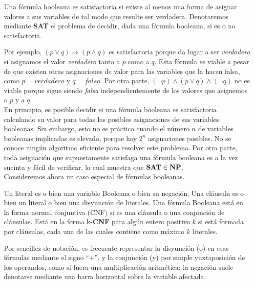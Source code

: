 \begin{fondo}
Una fórmula booleana es satisfactoria si existe al menos una forma de asignar valores a sus variables de tal modo que resulte ser verdadera. Denotaremos mediante \textbf{SAT} el problema de decidir, dada una fórmula booleana, si es o no satisfactoria.
\end{fondo}

Por ejemplo, $(p \lor q) \Longrightarrow (p \land q)$ es satisfactoria porque da lugar a ser \emph{verdadero} si asignamos el valor \emph{verdadero} tanto a $p$ como a $q$. Esta fórmula es viable a pesar de que existen otras asignaciones de valor para las variables que la hacen falsa, como $p = verdadero$ y $q = falso$. Por otra parte, $(\neg p) \land (p \lor q) \land (\neg q)$ no es viable porque sigue siendo \emph{falsa} independientemente de los valores que asignemos a $p$ y a $q$. \\

En principio, es posible decidir si una fórmula booleana es satisfactoria calculando su valor para todas las posibles asignaciones de sus variables booleanas. Sin embargo, esto no es práctico cuando el número $n$ de variables booleanas implicadas es elevado, porque hay $2^n$ asignaciones posibles. No se conoce ningún algoritmo eficiente para resolver este problema. Por otra parte, toda asignación que supuestamente satisfaga una fórmula booleana es a la vez sucinta y fácil de verificar, lo cual muestra que $\bf{SAT} \in \bf{NP}$.\\

Consideremos ahora un caso especial de fórmulas booleanas.\\

\begin{fondo}
Un literal es o bien una variable Booleana o bien su negación. Una cláusula es o bien un literal o bien una disyunción de literales. Una fórmula Booleana está en la forma normal conjuntiva (CNF) si es una cláusula o una conjunción de cláusulas. Está en la forma k-\textbf{CNF} para algún entero positivo $k$ si está formada por cláusulas, cada una de las cuales contiene como máximo $k$ literales.
\end{fondo}

Por sencillez de notación, es frecuente representar la disyunción (o) en esas fórmulas mediante el signo ``+'', y la conjunción (y) por simple yuxtaposición de los operandos, como si fuera una multiplicación aritmética; la negación suele denotarse mediante una barra horizontal sobre la variable afectada.\\

